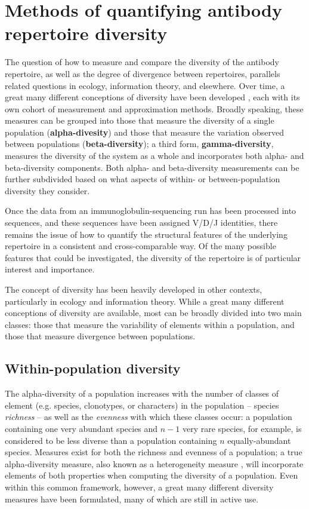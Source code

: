 \chapter{Methods of quantifying antibody repertoire diversity} %
\label{app:diversity}

The question of how to measure and compare the diversity of the antibody repertoire, as well as the degree of divergence between repertoires, parallels related questions in ecology, information theory, and elsewhere. Over time, a great many different conceptions of diversity have been developed \citep{peet1974diversity}, each with its own cohort of measurement and approximation methods. Broadly speaking, these measures can be grouped into those that measure the diversity of a single population (\textbf{alpha-divesity}) and those that measure the variation observed between populations (\textbf{beta-diversity}); a third form, \textbf{gamma-diversity}, measures the diversity of the system as a whole and incorporates both alpha- and beta-diversity components. Both alpha- and beta-diversity measurements can be further subdivided based on what aspects of within- or between-population diversity they consider. 


Once the data from an immunoglobulin-sequencing run has been processed into sequences, and these sequences have been assigned V/D/J identities, there remains the issue of how to quantify the structural features of the underlying repertoire in a consistent and cross-comparable way. Of the many possible features that could be investigated, the diversity of the repertoire is of particular interest and importance. 

The concept of diversity has been heavily developed in other contexts, particularly in ecology and information theory. While a great many different conceptions of diversity are available, most can be broadly divided into two main classes: those that measure the variability of elements within a population, and those that measure divergence between populations.

\section{Within-population diversity}
\label{sec:within}

The alpha-diversity of a population increases with the number of classes of element (e.g. species, clonotypes, or characters) in the population -- species \textit{richness} -- as well as the \textit{evenness} with which these classes occur: a population containing one very abundant species and $n-1$ very rare species, for example, is considered to be less diverse than a population containing $n$ equally-abundant species. %
Measures exist for both the richness and evenness of a population; a true alpha-diversity measure, also known as a heterogeneity measure \citep{peet1974diversity}, will incorporate elements of both properties when computing the diversity of a population. Even within this common framework, however, a great many different diversity measures have been formulated, many of which are still in active use. 

